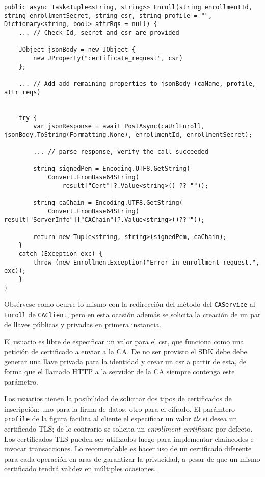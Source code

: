 \begin{lstlisting}[caption={M\'etodo \texttt{Enroll} de la clase \texttt{CAClient}.}, label={code:enrollClient}]
public async Task<Tuple<string, string>> Enroll(string enrollmentId, string enrollmentSecret, string csr, string profile = "", Dictionary<string, bool> attrRqs = null) {
	... // Check Id, secret and csr are provided
	
	JObject jsonBody = new JObject {
		new JProperty("certificate_request", csr)
	};
	
	... // Add add remaining properties to jsonBody (caName, profile, attr_reqs)
	

	try {
		var jsonResponse = await PostAsync(caUrlEnroll, 	jsonBody.ToString(Formatting.None), enrollmentId, enrollmentSecret);

		... // parse response, verify the call succeeded

		string signedPem = Encoding.UTF8.GetString(
			Convert.FromBase64String(
				result["Cert"]?.Value<string>() ?? ""));
		
		string caChain = Encoding.UTF8.GetString(
			Convert.FromBase64String(
result["ServerInfo"]["CAChain"]?.Value<string>()??""));

		return new Tuple<string, string>(signedPem, caChain);
	}
	catch (Exception exc) {
		throw (new EnrollmentException("Error in enrollment request.", exc));
	}
}
\end{lstlisting}

Obs\'ervese como ocurre lo mismo con la redirecci\'on del m\'etodo del \texttt{CAService} al \texttt{Enroll} de \texttt{CAClient}, pero en esta ocasi\'on adem\'as se solicita la creaci\'on de un par de llaves p\'ublicas y privadas en primera instancia.

El usuario es libre de especificar un valor para el csr, que funciona como una petici\'on de certificado a enviar a la CA. De no ser provisto el SDK debe debe generar una llave privada para la identidad y crear un csr a partir de esta, de forma que el llamado HTTP a la servidor de la CA siempre contenga este par\'ametro.

Los usuarios tienen la posibilidad de solicitar dos tipos de certificados de inscripción: uno para la firma de datos, otro para el cifrado. El par\'amtero \texttt{profile} de la figura facilita al cliente el especificar un valor \emph{tls} si desea un certificado TLS; de lo contrario se solicita un \emph{enrollment certificate} por defecto. Los certificados TLS pueden ser utilizados luego para implementar chaincodes e invocar transacciones. Lo recomendable es hacer uso de un certificado diferente para cada operaci\'on en aras de garantizar la privacidad, a pesar de que un mismo certificado tendr\'a validez en m\'ultiples ocasiones.

